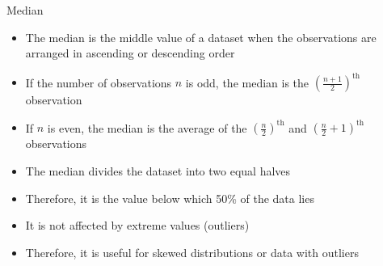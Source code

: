 \documentclass[12pt, aspectratio=169]{beamer}
\begin{document}




    \begin{frame}{Median}
        \begin{itemize}
            \item The median is the middle value of a dataset when the observations are arranged in ascending or descending order
            \item If the number of observations $n$ is odd, the median is the $(\frac{n+1}{2})^{\text{th}}$ observation
            \item If $n$ is even, the median is the average of the $(\frac{n}{2})^{\text{th}}$ and $\left(\frac{n}{2}+1\right)^{\text{th}}$ observations
            \item The median divides the dataset into two equal halves
            \item Therefore, it is the value below which 50\% of the data lies
            \item It is not affected by extreme values (outliers)
            \item Therefore, it is useful for skewed distributions or data with outliers
        \end{itemize}
    \end{frame}
\end{document}
